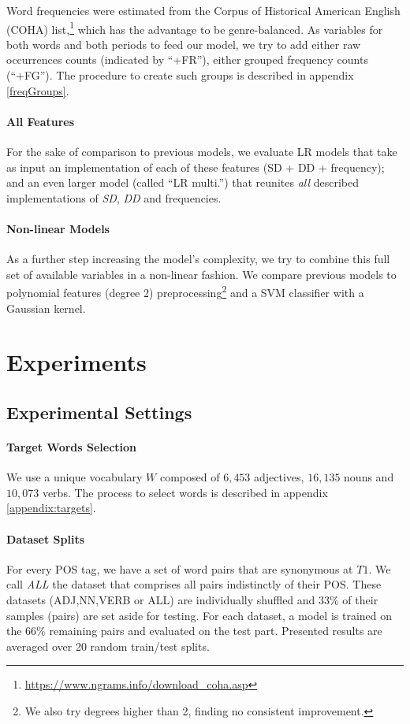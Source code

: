 \documentclass[11pt]{article}
\newcommand{\vocab}{W}
\newcommand{\firstTime}{T1}
\begin{document}
Word frequencies were estimated from the Corpus of Historical American English (COHA) list,\footnote{\url{https://www.ngrams.info/download_coha.asp}} which has the advantage to be genre-balanced. As variables for both words and both periods to feed our model, we try to add either raw occurrences counts (indicated by ``+FR''), either grouped frequency counts (``+FG''). The procedure to create such groups is described in appendix \ref{freqGroups}. 

\paragraph{All Features}
For the sake of comparison to previous models, we evaluate LR models that take as input an implementation of each of these features (SD + DD + frequency); and an even larger model (called ``LR multi.'') that reunites \textit{all} described implementations of \textit{SD}, \textit{DD} and frequencies.

\paragraph{Non-linear Models}
As a further step increasing the model's complexity, we try to combine this full set of available variables in a non-linear fashion. We compare previous models to polynomial features (degree 2) preprocessing\footnote{We also try degrees higher than 2, finding no consistent improvement.} and a SVM classifier with a Gaussian kernel.


\section{Experiments}
\label{sec:experiments}


\subsection{Experimental Settings}

\paragraph{Target Words Selection}
We use a unique vocabulary $\vocab$ composed of $6,453$ adjectives, $16,135$ nouns and $10,073$ verbs. The process to select words is described in appendix \ref{appendix:targets}.

\paragraph{Dataset Splits} For every POS tag, we have a set of word pairs that are synonymous at $\firstTime$. We call \textit{ALL} the dataset that comprises all pairs indistinctly of their POS. These datasets (ADJ,NN,VERB or ALL) are individually shuffled and 33\% of their samples (pairs) are set aside for testing. For each dataset, a model is trained on the 66\% remaining pairs and evaluated on the test part. Presented results are averaged over 20 random train/test splits.
\end{document}
